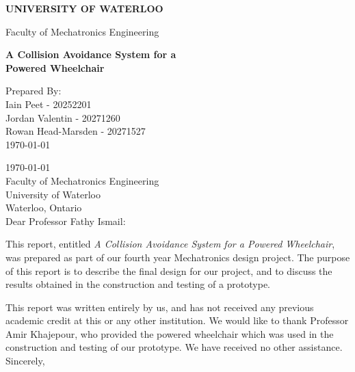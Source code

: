 \documentclass[oneside,final,a4paper]{report}
\begin{document}
\pagestyle{empty}

\begin{flushright}
 \begin{LARGE}
  \textbf{UNIVERSITY OF WATERLOO}
 \end{LARGE}

 \begin{large}
  Faculty of Mechatronics Engineering\\[4cm]
 \end{large}

 \begin{LARGE}
  \textbf{A Collision Avoidance System for a}\\
  \textbf{Powered Wheelchair}
 \end{LARGE}

 \vfill

  Prepared By: \\[0.2cm]
  Iain Peet - 20252201\\
  Jordan Valentin - 20271260\\
  Rowan Head-Marsden - 20271527\\
  \today
\end{flushright}
\clearpage

\today \\[0.5cm]

Faculty of Mechatronics Engineering \\
University of Waterloo \\
Waterloo, Ontario \\

Dear Professor Fathy Ismail:

This report, entitled \emph{A Collision Avoidance System for a Powered Wheelchair}, was prepared as part of our fourth year Mechatronics design project.  The purpose of this report is to describe the final design for our project, and to discuss the results obtained in the construction and testing of a prototype.

This report was written entirely by us, and has not received any previous academic credit at this or any other institution.  We would like to thank Professor Amir Khajepour, who provided the powered wheelchair which was used in the construction and testing of our prototype.  We have received no other assistance.
\\[0.5cm]

Sincerely, \\[1.5cm]
\end{document}
